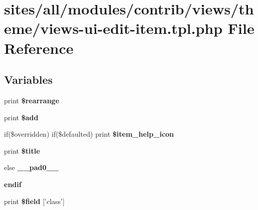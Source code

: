 \hypertarget{views-ui-edit-item_8tpl_8php}{
\section{sites/all/modules/contrib/views/theme/views-ui-edit-item.tpl.php File Reference}
\label{views-ui-edit-item_8tpl_8php}
}
\subsection*{Variables}
\begin{CompactItemize}
\item 
\hypertarget{views-ui-edit-item_8tpl_8php_b15f37c8688b5a7c04422b0217148d94}{
print \textbf{\$rearrange}}
\label{views-ui-edit-item_8tpl_8php_b15f37c8688b5a7c04422b0217148d94}

\item 
\hypertarget{views-ui-edit-item_8tpl_8php_171274f668d4a8f1c92ff17bfb52f9b6}{
print \textbf{\$add}}
\label{views-ui-edit-item_8tpl_8php_171274f668d4a8f1c92ff17bfb52f9b6}

\item 
\hypertarget{views-ui-edit-item_8tpl_8php_329ac17389e1d631fa908a22a788fe2f}{
if(\$overridden) if(\$defaulted) print \textbf{\$item\_\-help\_\-icon}}
\label{views-ui-edit-item_8tpl_8php_329ac17389e1d631fa908a22a788fe2f}

\item 
\hypertarget{views-ui-edit-item_8tpl_8php_ec2795512d255332f57cacd930a090b4}{
print \textbf{\$title}}
\label{views-ui-edit-item_8tpl_8php_ec2795512d255332f57cacd930a090b4}

\item 
\hypertarget{views-ui-edit-item_8tpl_8php_8e01dcc96c43199448ee66f7c2ae8ea6}{
else \textbf{\_\-\_\-pad0\_\-\_\-}}
\label{views-ui-edit-item_8tpl_8php_8e01dcc96c43199448ee66f7c2ae8ea6}

\item 
\hypertarget{views-ui-edit-item_8tpl_8php_82cd33ca97ff99f2fcc5e9c81d65251b}{
\textbf{endif}}
\label{views-ui-edit-item_8tpl_8php_82cd33ca97ff99f2fcc5e9c81d65251b}

\item 
\hypertarget{views-ui-edit-item_8tpl_8php_5140a47de84029c7f8344a3a97fb7bce}{
print \textbf{\$field} \mbox{[}'class'\mbox{]}}
\label{views-ui-edit-item_8tpl_8php_5140a47de84029c7f8344a3a97fb7bce}


\end{CompactItemize}
